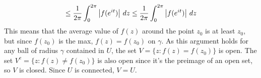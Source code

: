 \documentclass{homework}
\begin{document}
\begin{solution}
\begin{align*}
                                                                                                                                                                                                                                                                                                            \leq \frac{1}{2\pi}\int_0^{2\pi} \left|f(e^{it})\right| \, dz
                                                                                                                                                                                                                                                                                                            \leq    \frac{1}{2\pi}\int_0^{2\pi} \left|f(e^{it})\right| \, dz
                                                                                                                                                                                                                                                                                                            \end{align*}
                                                                                                                                                                                                                                                                                                            This means that the average value of $f(z)$ around the point $z_0$ is at least $z_0$, but since $f(z_0)$ is the max, $f(z)=f(z_0)$ on $\gamma$. As this argument holds for any ball of radius $\gamma$ contained in $U$, the set $V = \{z:f(z) = f(z_0)\}$ is open. The set $V^c = \{z:f(z)\neq f(z_0)\}$ is also open since it's the preimage of an open set, so $V$ is closed. Since $U$ is connected, $V=U$.
                                                                                                                                                                                                                                                                                                            \end{solution}

                                                                                                                                                                                                                                                                                                            
\end{document}
